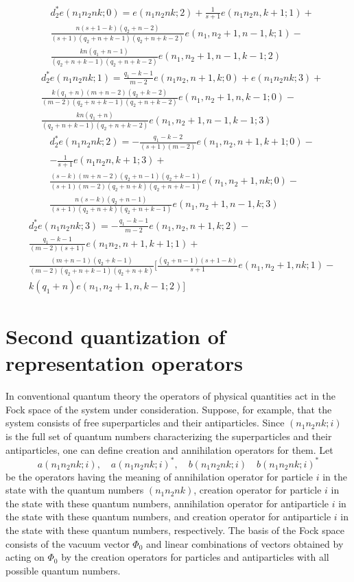 \documentclass[a4paper,12pt]{article}%
\begin{document}
\begin{eqnarray}
&d_2^*e(n_1n_2nk;0)=e(n_1n_2nk;2)+\frac{1}{s+1}
e(n_1n_2n,k+1;1)+\nonumber\\
&\frac{n(s+1-k)(q_2+n-2)}{(s+1)(q_2+n+k-1)(q_2+n+k-2)}
e(n_1,n_2+1,n-1,k;1)-\nonumber\\
&\frac{kn(q_1+n-1)}{(q_2+n+k-1)(q_2+n+k-2)}e(n_1,n_2+1,n-1,k-1;2)
\label{49}
\end{eqnarray}
\begin{eqnarray}
&d_2^*e(n_1n_2nk;1)=\frac{q_1-k-1}{m-2}e(n_1n_2,n+1,k;0)+
e(n_1n_2nk;3)+\nonumber\\
&\frac{k(q_1+n)(m+n-2)(q_2+k-2)}{(m-2)(q_2+n+k-1)(q_2+n+k-2)}
e(n_1,n_2+1,n,k-1;0)-\nonumber\\
&\frac{kn(q_1+n)}{(q_2+n+k-1)(q_2+n+k-2)}e(n_1,n_2+1,n-1,k-1;3)
\label{50}
\end{eqnarray}
\begin{eqnarray}
&d_2^*e(n_1n_2nk;2)=-\frac{q_1-k-2}{(s+1)(m-2)}
e(n_1,n_2,n+1,k+1;0)-\nonumber\\
&-\frac{1}{s+1}e(n_1n_2n,k+1;3)+\nonumber\\
&\frac{(s-k)(m+n-2)(q_2+n-1)(q_2+k-1)}{(s+1)(m-2)(q_2+n+k)(q_2+n+k-1)}
e(n_1,n_2+1,nk;0)-\nonumber\\
&\frac{n(s-k)(q_2+n-1)}{(s+1)(q_2+n+k)(q_2+n+k-1)}e(n_1,n_2+1,n-1,k;3)
\label{51}
\end{eqnarray}
\begin{eqnarray}
&d_2^*e(n_1n_2nk;3)=-\frac{q_1-k-1}{m-2}
e(n_1,n_2,n+1,k;2)-\nonumber\\
&\frac{q_1-k-1}{(m-2)(s+1)}e(n_1n_2,n+1,k+1;1)+\nonumber\\
&\frac{(m+n-1)(q_2+k-1)}{(m-2)(q_2+n+k-1)(q_2+n+k)}
[\frac{(q_2+n-1)(s+1-k)}{s+1}e(n_1,n_2+1,nk;1)-\nonumber\\
&k(q_1+n)e(n_1,n_2+1,n,k-1;2)]
\label{52}
\end{eqnarray}

\section{Second quantization of representation operators}
\label{S6}

In conventional quantum theory the operators of 
physical quantities act in the Fock space of the system under 
consideration. Suppose, for example, that the system consists
of free superparticles and their antiparticles.
Since $(n_1n_2nk;i)$ is the full set of quantum numbers
characterizing the superparticles and their antiparticles, one
can define creation and annihilation operators for them.
Let
$$a(n_1n_2nk;i),\quad a(n_1n_2nk;i)^*, 
\quad b(n_1n_2nk;i)\quad b(n_1n_2nk;i)^*$$
be the operators having the meaning of annihilation operator 
for particle $i$ in the state with the quantum numbers $(n_1n_2nk)$,
creation operator 
for particle $i$ in the state with these quantum numbers,
annihilation operator 
for antiparticle $i$ in the state with these quantum numbers,
and creation operator 
for antiparticle $i$ in the state with these quantum numbers, respectively.
The basis of the Fock space consists of the vacuum vector $\Phi_0$ and
linear combinations of vectors obtained by acting on $\Phi_0$ by 
the creation operators for particles and antiparticles with all
possible quantum numbers.
\end{document}
